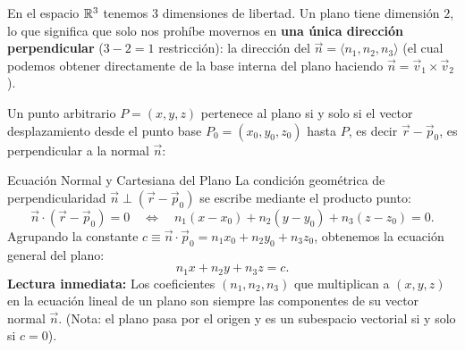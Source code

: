 \documentclass[11pt,letterpaper]{article}
\begin{document}
En el espacio $\mathbb{R}^3$ tenemos $3$ dimensiones de libertad. Un plano tiene dimensión $2$, lo que significa que solo nos prohíbe movernos en \textbf{una única dirección perpendicular} ($3 - 2 = 1$ restricción): la dirección del  $\vec{n} = \langle n_1, n_2, n_3 \rangle$ (el cual podemos obtener directamente de la base interna del plano haciendo $\vec{n} = \vec{v}_1 \times \vec{v}_2$).

Un punto arbitrario $P = (x, y, z)$ pertenece al plano si y solo si el vector desplazamiento desde el punto base $P_0 = (x_0, y_0, z_0)$ hasta $P$, es decir $\vec{r} - \vec{p}_0$, es perpendicular a la normal $\vec{n}$:

\begin{theorembox}{Ecuación Normal y Cartesiana del Plano}
La condición geométrica de perpendicularidad $\vec{n} \perp (\vec{r} - \vec{p}_0)$ se escribe mediante el producto punto:
\[
\vec{n} \cdot (\vec{r} - \vec{p}_0) = 0 \quad \Longleftrightarrow \quad n_1(x - x_0) + n_2(y - y_0) + n_3(z - z_0) = 0.
\]
Agrupando la constante $c \equiv \vec{n}\cdot\vec{p}_0 = n_1 x_0 + n_2 y_0 + n_3 z_0$, obtenemos la ecuación general del plano:
\[
n_1 x + n_2 y + n_3 z = c.
\]
\textbf{Lectura inmediata:} Los coeficientes $(n_1, n_2, n_3)$ que multiplican a $(x, y, z)$ en la ecuación lineal de un plano son siempre las componentes de su vector normal $\vec{n}$. (Nota: el plano pasa por el origen y es un subespacio vectorial si y solo si $c = 0$).
\end{theorembox}
\end{document}
